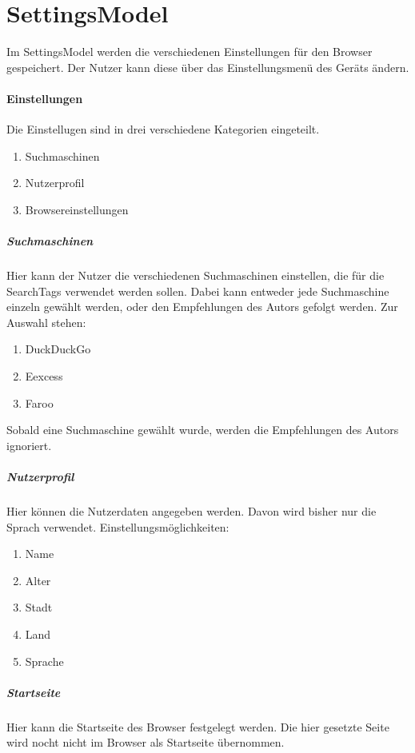 
\section{SettingsModel}
Im SettingsModel werden die verschiedenen Einstellungen für den Browser gespeichert.
Der Nutzer kann diese über das Einstellungsmenü des Geräts ändern.

\paragraph{Einstellungen}
Die Einstellugen sind in drei verschiedene Kategorien eingeteilt.
\begin{enumerate}  
     \item Suchmaschinen  
     \item Nutzerprofil
     \item Browsereinstellungen
\end{enumerate}

\subparagraph{Suchmaschinen}
Hier kann der Nutzer die verschiedenen Suchmaschinen einstellen, die für die SearchTags verwendet werden sollen.
Dabei kann entweder jede Suchmaschine einzeln gewählt werden, oder den Empfehlungen des Autors gefolgt werden.
Zur Auswahl stehen:
\begin{enumerate}  
     \item DuckDuckGo
     \item Eexcess
     \item Faroo  
\end{enumerate}
Sobald eine Suchmaschine gewählt wurde, werden die Empfehlungen des Autors ignoriert.

\subparagraph{Nutzerprofil}
Hier können die Nutzerdaten angegeben werden.
Davon wird bisher nur die Sprach verwendet.
Einstellungsmöglichkeiten:
\begin{enumerate}  
     \item Name  
     \item Alter  
     \item Stadt
     \item Land
     \item Sprache
\end{enumerate}

\subparagraph{Startseite}
Hier kann die Startseite des Browser festgelegt werden.
Die hier gesetzte Seite wird nocht nicht im Browser als Startseite übernommen.
